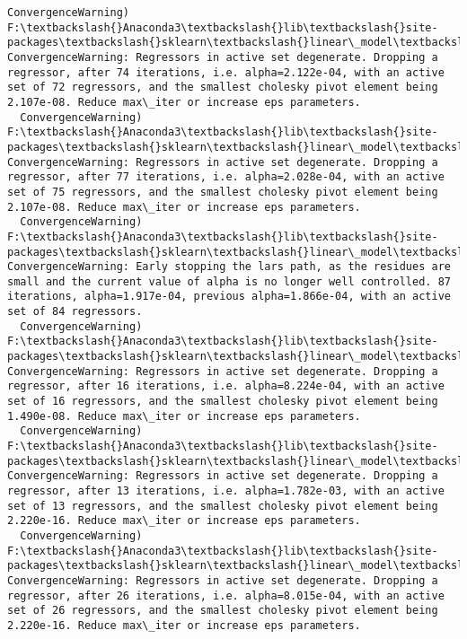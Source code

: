 \documentclass[11pt]{article}
\begin{document}
\begin{Verbatim}[commandchars=\\\{\}]
  ConvergenceWarning)
F:\textbackslash{}Anaconda3\textbackslash{}lib\textbackslash{}site-packages\textbackslash{}sklearn\textbackslash{}linear\_model\textbackslash{}least\_angle.py:313: ConvergenceWarning: Regressors in active set degenerate. Dropping a regressor, after 74 iterations, i.e. alpha=2.122e-04, with an active set of 72 regressors, and the smallest cholesky pivot element being 2.107e-08. Reduce max\_iter or increase eps parameters.
  ConvergenceWarning)
F:\textbackslash{}Anaconda3\textbackslash{}lib\textbackslash{}site-packages\textbackslash{}sklearn\textbackslash{}linear\_model\textbackslash{}least\_angle.py:313: ConvergenceWarning: Regressors in active set degenerate. Dropping a regressor, after 77 iterations, i.e. alpha=2.028e-04, with an active set of 75 regressors, and the smallest cholesky pivot element being 2.107e-08. Reduce max\_iter or increase eps parameters.
  ConvergenceWarning)
F:\textbackslash{}Anaconda3\textbackslash{}lib\textbackslash{}site-packages\textbackslash{}sklearn\textbackslash{}linear\_model\textbackslash{}least\_angle.py:339: ConvergenceWarning: Early stopping the lars path, as the residues are small and the current value of alpha is no longer well controlled. 87 iterations, alpha=1.917e-04, previous alpha=1.866e-04, with an active set of 84 regressors.
  ConvergenceWarning)
F:\textbackslash{}Anaconda3\textbackslash{}lib\textbackslash{}site-packages\textbackslash{}sklearn\textbackslash{}linear\_model\textbackslash{}least\_angle.py:313: ConvergenceWarning: Regressors in active set degenerate. Dropping a regressor, after 16 iterations, i.e. alpha=8.224e-04, with an active set of 16 regressors, and the smallest cholesky pivot element being 1.490e-08. Reduce max\_iter or increase eps parameters.
  ConvergenceWarning)
F:\textbackslash{}Anaconda3\textbackslash{}lib\textbackslash{}site-packages\textbackslash{}sklearn\textbackslash{}linear\_model\textbackslash{}least\_angle.py:313: ConvergenceWarning: Regressors in active set degenerate. Dropping a regressor, after 13 iterations, i.e. alpha=1.782e-03, with an active set of 13 regressors, and the smallest cholesky pivot element being 2.220e-16. Reduce max\_iter or increase eps parameters.
  ConvergenceWarning)
F:\textbackslash{}Anaconda3\textbackslash{}lib\textbackslash{}site-packages\textbackslash{}sklearn\textbackslash{}linear\_model\textbackslash{}least\_angle.py:313: ConvergenceWarning: Regressors in active set degenerate. Dropping a regressor, after 26 iterations, i.e. alpha=8.015e-04, with an active set of 26 regressors, and the smallest cholesky pivot element being 2.220e-16. Reduce max\_iter or increase eps parameters.

\end{Verbatim}
\end{document}

